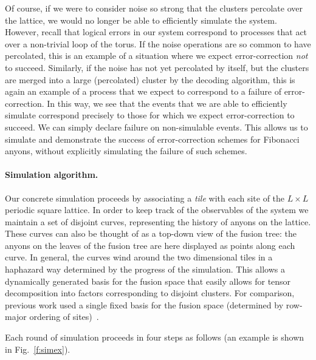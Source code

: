 \documentclass[aps, prl, letterpaper, twocolumn, superscriptaddress, notitlepage, 10pt]{revtex4-1}
\newcommand{\Fref}[1]{Fig.~\ref{#1}}
\begin{document}
Of course, if we were to consider noise so strong that the clusters percolate over the lattice, 
we would no longer be able to efficiently simulate the system. However, recall that logical 
errors in our system correspond to processes that act over a non-trivial loop of the torus. If 
the noise operations are so common to have percolated, this is an example of a situation 
where we expect error-correction \emph{not} to succeed. Similarly, if the noise has not yet 
percolated by itself, but the clusters are merged into a large (percolated) cluster by the 
decoding algorithm, this is again an example of a process that we expect to correspond to a 
failure of error-correction. In this way, we see that the events that we are able to efficiently 
simulate correspond precisely to those for which we expect error-correction to succeed. We 
can simply declare failure on non-simulable events. This allows us to simulate and 
demonstrate the success of error-correction schemes for Fibonacci anyons, without explicitly 
simulating the failure of such schemes.

\paragraph{Simulation algorithm.}

Our concrete simulation proceeds by associating a \emph{tile} with each site of the 
$L\times L$ periodic square lattice.
In order to keep track of the observables of the system 
we maintain a set of disjoint curves, representing the history of anyons on the lattice.
These curves can also be thought of as a top-down view of the fusion tree:
the anyons on the leaves of the fusion tree are here displayed as points along each curve.
In general, the curves wind around the two 
dimensional tiles in a haphazard way determined by the progress of the simulation.
This allows a dynamically generated basis for the fusion space that easily allows for tensor 
decomposition into factors corresponding to disjoint clusters.
For comparison, previous work 
used a single fixed basis for the fusion space (determined by row-major ordering of 
sites)~\cite{Brell2013}.

Each round of simulation proceeds in four steps as follows (an example is shown 
in \Fref{f:simex}).
\end{document}
